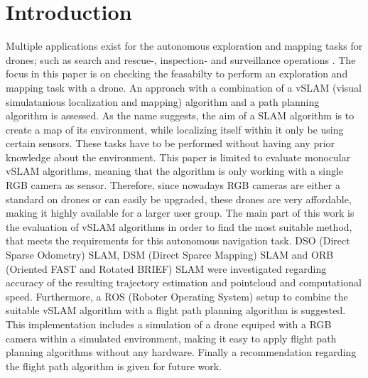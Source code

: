 \chapter{Introduction}

Multiple applications exist for the autonomous exploration and mapping tasks for drones;
 such as search and rescue-, inspection- and surveillance operations \cite{tasks}.
 The focus in this paper is on checking the feasabilty to perform an exploration and mapping task with a drone.
An approach with a combination of a vSLAM (visual simulatanious localization
and mapping) algorithm and a path planning algorithm is assessed. As the name 
suggests, the aim of a SLAM algorithm is to create a map of its environment, while localizing itself within it only be using certain sensors. These
tasks have to be performed without having any prior knowledge about the environment. 
 This paper is limited to evaluate monocular vSLAM algorithms, meaning that the algorithm is only working
 with a single RGB camera as sensor. Therefore, since nowadays RGB cameras are either a standard on drones or can easily be upgraded, these drones are very affordable, making it highly available for a larger user group.  
The main part of this work is the evaluation of vSLAM algorithms in order to find the 
most suitable method, that meets the requirements for this autonomous navigation task.
 DSO (Direct Sparse Odometry) SLAM, DSM (Direct Sparce Mapping) SLAM and ORB (Oriented FAST and Rotated BRIEF)
 SLAM were investigated regarding accuracy of the resulting trajectory estimation and pointcloud and computational speed. 
Furthermore, a ROS (Roboter Operating System) setup to combine the suitable vSLAM algorithm with a flight
 path planning algorithm is suggested. This implementation includes a simulation of a drone equiped with a RGB camera within a 
 simulated environment, making it easy to apply flight path planning algorithms without any hardware.
 Finally a recommendation regarding the flight path algorithm is given for future work.
 




